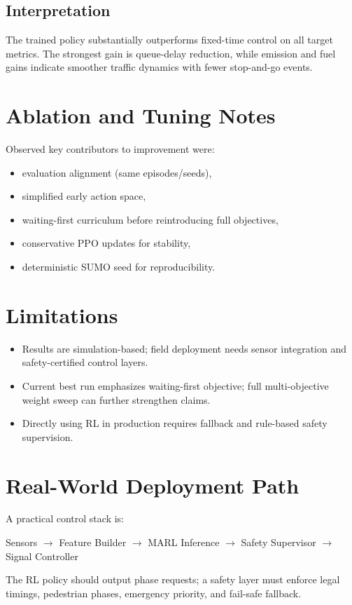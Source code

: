 \documentclass[conference]{IEEEtran}
\begin{document}
\subsection{Interpretation}
The trained policy substantially outperforms fixed-time control on all target metrics. The strongest gain is queue-delay reduction, while emission and fuel gains indicate smoother traffic dynamics with fewer stop-and-go events.

\section{Ablation and Tuning Notes}
Observed key contributors to improvement were:
\begin{itemize}
    \item evaluation alignment (same episodes/seeds),
    \item simplified early action space,
    \item waiting-first curriculum before reintroducing full objectives,
    \item conservative PPO updates for stability,
    \item deterministic SUMO seed for reproducibility.
\end{itemize}

\section{Limitations}
\begin{itemize}
    \item Results are simulation-based; field deployment needs sensor integration and safety-certified control layers.
    \item Current best run emphasizes waiting-first objective; full multi-objective weight sweep can further strengthen claims.
    \item Directly using RL in production requires fallback and rule-based safety supervision.
\end{itemize}

\section{Real-World Deployment Path}
A practical control stack is:
\begin{center}
Sensors $\rightarrow$ Feature Builder $\rightarrow$ MARL Inference $\rightarrow$ Safety Supervisor $\rightarrow$ Signal Controller
\end{center}
The RL policy should output phase requests; a safety layer must enforce legal timings, pedestrian phases, emergency priority, and fail-safe fallback.
\end{document}
